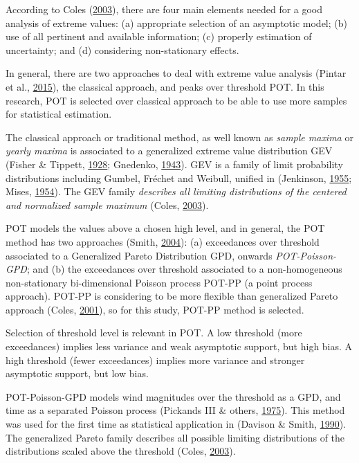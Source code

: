 \documentclass[12pt,twoside]{reedthesis}
\begin{document}
According to Coles (\protect\hyperlink{ref-Coles2003}{2003}), there are four main elements needed for a good analysis of extreme values: (a) appropriate selection of an asymptotic model; (b) use of all pertinent and available information; (c) properly estimation of uncertainty; and (d) considering non-stationary effects.

In general, there are two approaches to deal with extreme value analysis (Pintar et al., \protect\hyperlink{ref-Pintar2015}{2015}), the classical approach, and peaks over threshold POT. In this research, POT is selected over classical approach to be able to use more samples for statistical estimation.

The classical approach or traditional method, as well known as \emph{sample maxima} or \emph{yearly maxima} is associated to a generalized extreme value distribution GEV (Fisher \& Tippett, \protect\hyperlink{ref-Fisher1928}{1928}; Gnedenko, \protect\hyperlink{ref-Gnedenko1943}{1943}). GEV is a family of limit probability distributions including Gumbel, Fréchet and Weibull, unified in (Jenkinson, \protect\hyperlink{ref-Jenkinson1955}{1955}; Mises, \protect\hyperlink{ref-Mises1954}{1954}). The GEV family \emph{describes all limiting distributions of the centered and normalized sample maximum} (Coles, \protect\hyperlink{ref-Coles2003}{2003}).

POT models the values above a chosen high level, and in general, the POT method has two approaches (Smith, \protect\hyperlink{ref-Smith2004}{2004}): (a) exceedances over threshold associated to a Generalized Pareto Distribution GPD, onwards \emph{POT-Poisson-GPD}; and (b) the exceedances over threshold associated to a non-homogeneous non-stationary bi-dimensional Poisson process POT-PP (a point process approach). POT-PP is considering to be more flexible than generalized Pareto approach (Coles, \protect\hyperlink{ref-Coles2001}{2001}), so for this study, POT-PP method is selected.

Selection of threshold level is relevant in POT. A low threshold (more exceedances) implies less variance and weak asymptotic support, but high bias. A high threshold (fewer exceedances) implies more variance and stronger asymptotic support, but low bias.

POT-Poisson-GPD models wind magnitudes over the threshold as a GPD, and time as a separated Poisson process (Pickands III \& others, \protect\hyperlink{ref-PickandsIII1975}{1975}). This method was used for the first time as statistical application in (Davison \& Smith, \protect\hyperlink{ref-Davison1990}{1990}). The generalized Pareto family describes all possible limiting distributions of the distributions scaled above the threshold (Coles, \protect\hyperlink{ref-Coles2003}{2003}).
\end{document}
